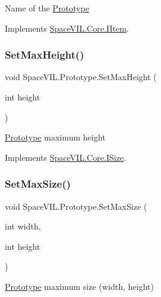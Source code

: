 Name of the \mbox{\hyperlink{class_space_v_i_l_1_1_prototype}{Prototype}} 



Implements \mbox{\hyperlink{interface_space_v_i_l_1_1_core_1_1_i_item}{Space\+V\+I\+L.\+Core.\+I\+Item}}.

\mbox{\label{class_space_v_i_l_1_1_prototype_ae36a8ab0a4dff36218f56ae4cc9d39d4}} 
\subsubsection{\texorpdfstring{Set\+Max\+Height()}{SetMaxHeight()}}
{\footnotesize\ttfamily void Space\+V\+I\+L.\+Prototype.\+Set\+Max\+Height (\begin{DoxyParamCaption}\item[{int}]{height }\end{DoxyParamCaption})}



\mbox{\hyperlink{class_space_v_i_l_1_1_prototype}{Prototype}} maximum height 



Implements \mbox{\hyperlink{interface_space_v_i_l_1_1_core_1_1_i_size}{Space\+V\+I\+L.\+Core.\+I\+Size}}.

\mbox{\label{class_space_v_i_l_1_1_prototype_a9870d610d71b1dddfb2ca9e20243d6b5}} 
\subsubsection{\texorpdfstring{Set\+Max\+Size()}{SetMaxSize()}}
{\footnotesize\ttfamily void Space\+V\+I\+L.\+Prototype.\+Set\+Max\+Size (\begin{DoxyParamCaption}\item[{int}]{width,  }\item[{int}]{height }\end{DoxyParamCaption})}



\mbox{\hyperlink{class_space_v_i_l_1_1_prototype}{Prototype}} maximum size (width, height) 

